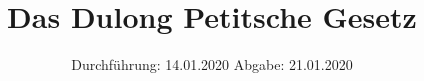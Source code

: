 

\subject{V201}
\title{Das Dulong Petitsche Gesetz}
\date{%
  Durchführung: 14.01.2020
  \hspace{3em}
  Abgabe: 21.01.2020
}



\maketitle
\thispagestyle{empty}
\tableofcontents
\newpage








\printbibliography{}


